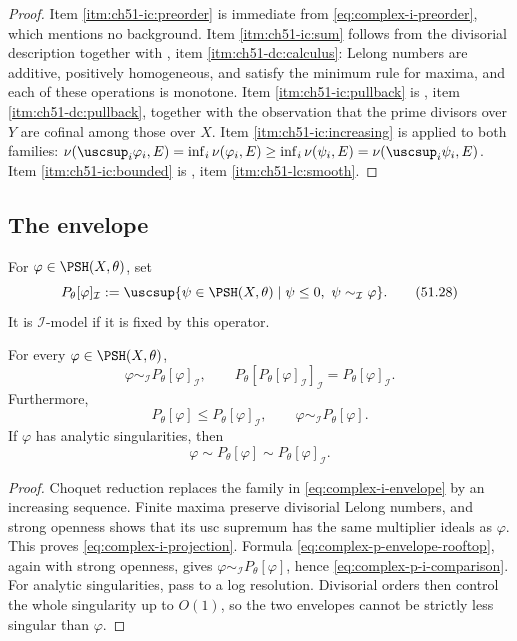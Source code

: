 \begin{proof}
Item \cref{itm:ch51-ic:preorder} is immediate from
\eqref{eq:complex-i-preorder}, which mentions no background.  Item
\cref{itm:ch51-ic:sum} follows from the divisorial description together
with , item
\cref{itm:ch51-dc:calculus}: Lelong numbers are additive, positively
homogeneous, and satisfy the minimum rule for maxima, and each of these
operations is monotone.  Item \cref{itm:ch51-ic:pullback} is
, item \cref{itm:ch51-dc:pullback},
together with the observation that the prime divisors over \(Y\) are
cofinal among those over \(X\).  Item \cref{itm:ch51-ic:increasing} is
 applied to both families:
\(\nu(\uscsup_i\varphi_i,E)=\inf_i\nu(\varphi_i,E)
\geq\inf_i\nu(\psi_i,E)=\nu(\uscsup_i\psi_i,E)\).  Item
\cref{itm:ch51-ic:bounded} is , item
\cref{itm:ch51-lc:smooth}.
\end{proof}

\subsection{The envelope}
\label{sec:ch51-i-envelope-def}

\begin{definition}
\label{def:complex-i-envelope}
For \(\varphi\in\PSH(X,\theta)\), set
\[
 P_\theta[\varphi]_{\mathcal I}
 :=\uscsup\{\psi\in\PSH(X,\theta)\mid
          \psi\leq0,\ \psi\sim_{\mathcal I}\varphi\}.
\tag{51.28}\label{eq:complex-i-envelope}
\]
It is \(\mathcal I\)-model if it is fixed by this operator.
\end{definition}

\begin{theorem}\label{thm:complex-i-projection}
For every \(\varphi\in\PSH(X,\theta)\),
\[
 \varphi\sim_{\mathcal I}P_\theta[\varphi]_{\mathcal I},
\qquad
 P_\theta[P_\theta[\varphi]_{\mathcal I}]_{\mathcal I}
      =P_\theta[\varphi]_{\mathcal I}.
\tag{51.29}\label{eq:complex-i-projection}
\]
Furthermore,
\[
 P_\theta[\varphi]\leq P_\theta[\varphi]_{\mathcal I},
\qquad
 \varphi\sim_{\mathcal I}P_\theta[\varphi].
\tag{51.30}\label{eq:complex-p-i-comparison}
\]
If \(\varphi\) has analytic singularities, then
\[
 \varphi\sim P_\theta[\varphi]
        \sim P_\theta[\varphi]_{\mathcal I}.
\tag{51.31}\label{eq:complex-analytic-envelope-agreement}
\]
\end{theorem}

\begin{proof}
Choquet reduction replaces the family in
\eqref{eq:complex-i-envelope} by an increasing sequence.  Finite maxima
preserve divisorial Lelong numbers, and strong openness shows that its
usc supremum has the same multiplier ideals as \(\varphi\).  This proves
\eqref{eq:complex-i-projection}.  Formula
\eqref{eq:complex-p-envelope-rooftop}, again with strong openness, gives
\(\varphi\sim_{\mathcal I}P_\theta[\varphi]\), hence
\eqref{eq:complex-p-i-comparison}.  For analytic singularities, pass to
a log resolution.  Divisorial orders then control the whole singularity
up to \(O(1)\), so the two envelopes cannot be strictly less singular
than \(\varphi\).
\end{proof}

